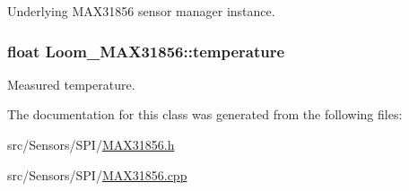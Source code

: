 Underlying M\+A\+X31856 sensor manager instance. 

\subsubsection[{\texorpdfstring{temperature}{temperature}}]{\setlength{\rightskip}{0pt plus 5cm}float Loom\+\_\+\+M\+A\+X31856\+::temperature\hspace{0.3cm}{\ttfamily [protected]}}\hypertarget{class_loom___m_a_x31856_a108e2bfbf0836dce8b3ec9d4790bf94c}{}\label{class_loom___m_a_x31856_a108e2bfbf0836dce8b3ec9d4790bf94c}


Measured temperature. 



The documentation for this class was generated from the following files\+:\begin{DoxyCompactItemize}
\item 
src/\+Sensors/\+S\+P\+I/\hyperlink{_m_a_x31856_8h}{M\+A\+X31856.\+h}\item 
src/\+Sensors/\+S\+P\+I/\hyperlink{_m_a_x31856_8cpp}{M\+A\+X31856.\+cpp}\end{DoxyCompactItemize}
